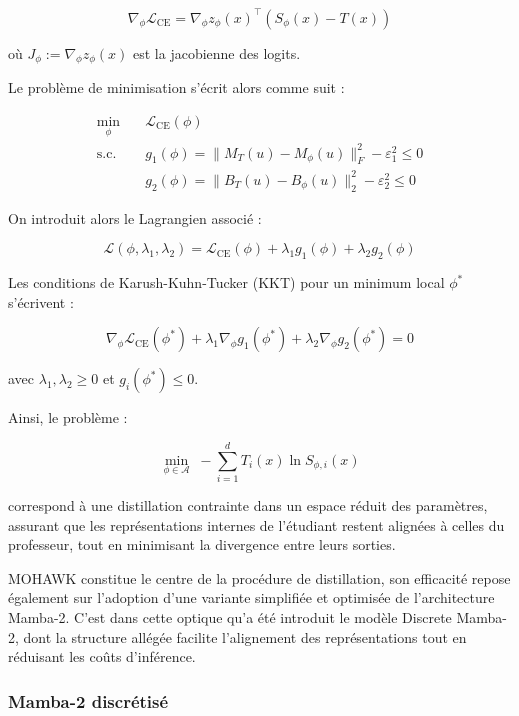\begin{demonstration}
\[
\nabla_\phi \mathcal{L}_{\text{CE}} = \nabla_\phi z_\phi(x)^\top (S_\phi(x) - T(x))
\]

où $J_\phi := \nabla_\phi z_\phi(x)$ est la jacobienne des logits.

Le problème de minimisation s’écrit alors comme suit :

\[
\begin{aligned}
\min_\phi & \quad \mathcal{L}_{\text{CE}}(\phi) \\
\text{s.c.} & \quad g_1(\phi) = \|M_T(u) - M_\phi(u)\|_F^2 - \varepsilon_1^2 \leq 0 \\
           & \quad g_2(\phi) = \|B_T(u) - B_\phi(u)\|_2^2 - \varepsilon_2^2 \leq 0
\end{aligned}
\]

On introduit alors le Lagrangien associé :

\[
\mathcal{L}(\phi, \lambda_1, \lambda_2) = \mathcal{L}_{\text{CE}}(\phi) + \lambda_1 g_1(\phi) + \lambda_2 g_2(\phi)
\]

Les conditions de Karush-Kuhn-Tucker (KKT) pour un minimum local $\phi^*$ s’écrivent :

\[
\nabla_\phi \mathcal{L}_{\text{CE}}(\phi^*) + \lambda_1 \nabla_\phi g_1(\phi^*) + \lambda_2 \nabla_\phi g_2(\phi^*) = 0
\]

avec $\lambda_1, \lambda_2 \geq 0$ et $g_i(\phi^*) \leq 0$.

Ainsi, le problème :

\[
\min_{\phi \in \mathcal{A}} \; -\sum_{i=1}^d T_i(x) \ln S_{\phi,i}(x)
\]

correspond à une distillation contrainte dans un espace réduit des paramètres, assurant que les représentations internes de l’étudiant restent alignées à celles du professeur, tout en minimisant la divergence entre leurs sorties.

\end{demonstration}

MOHAWK constitue le centre de la procédure de distillation, son efficacité repose également sur l’adoption d’une variante simplifiée et optimisée de l’architecture Mamba-2. C’est dans cette optique qu’a été introduit le modèle Discrete Mamba-2, dont la structure allégée facilite l’alignement des représentations tout en réduisant les coûts d’inférence. 

\subsubsection{Mamba-2 discrétisé}

